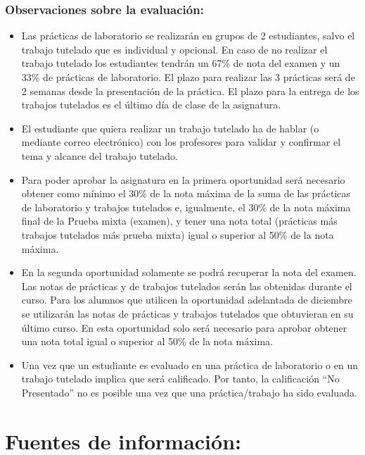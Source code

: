 \documentclass[]{book}
\begin{document}
\subsubsection{Observaciones sobre la
evaluación:}\label{observaciones-sobre-la-evaluacion}

\begin{itemize}
\item
  Las prácticas de laboratorio se realizarán en grupos de 2 estudiantes,
  salvo el trabajo tutelado que es individual y opcional. En caso de no
  realizar el trabajo tutelado los estudiantes tendrán un 67\% de nota
  del examen y un 33\% de prácticas de laboratorio. El plazo para
  realizar las 3 prácticas será de 2 semanas desde la presentación de la
  práctica. El plazo para la entrega de los trabajos tutelados es el
  último día de clase de la asignatura.
\item
  El estudiante que quiera realizar un trabajo tutelado ha de hablar (o
  mediante correo electrónico) con los profesores para validar y
  confirmar el tema y alcance del trabajo tutelado.
\item
  Para poder aprobar la asignatura en la primera oportunidad será
  necesario obtener como mínimo el 30\% de la nota máxima de la suma de
  las prácticas de laboratorio y trabajos tutelados e, igualmente, el
  30\% de la nota máxima final de la Prueba mixta (examen), y tener una
  nota total (prácticas más trabajos tutelados más prueba mixta) igual o
  superior al 50\% de la nota máxima.
\item
  En la segunda oportunidad solamente se podrá recuperar la nota del
  examen. Las notas de prácticas y de trabajos tutelados serán las
  obtenidas durante el curso. Para los alumnos que utilicen la
  oportunidad adelantada de diciembre se utilizarán las notas de
  prácticas y trabajos tutelados que obtuvieran en su último curso. En
  esta oportunidad solo será necesario para aprobar obtener una nota
  total igual o superior al 50\% de la nota máxima.
\item
  Una vez que un estudiante es evaluado en una práctica de laboratorio o
  en un trabajo tutelado implica que será calificado. Por tanto, la
  calificación ``No Presentado'' no es posible una vez que una
  práctica/trabajo ha sido evaluada.
\end{itemize}

\section{Fuentes de información:}\label{fuentes-de-informacion}
\end{document}

